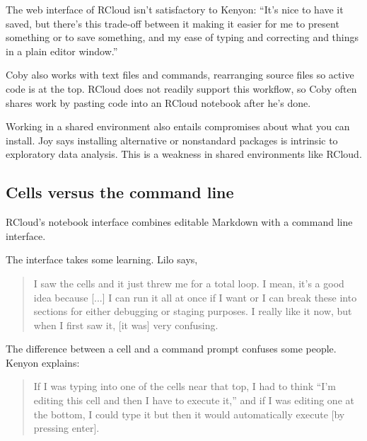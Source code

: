 The web interface of RCloud isn't satisfactory to Kenyon: ``It's nice to have
it saved, but there's this trade-off between it making it easier for me to
present something or to save something, and my ease of typing and
correcting and things in a plain editor window.''

Coby also works with text files and commands, rearranging source files
so active code is at the top. RCloud does not readily support this
workflow, so Coby often shares work by pasting code into an RCloud
notebook after he's done.


Working in a shared environment also entails compromises about what you can
install. Joy says installing alternative or nonstandard packages is
intrinsic to exploratory data analysis. This is a weakness in shared
environments like RCloud.

\subsection{Cells versus the command line}
RCloud's notebook interface combines editable Markdown with a command line
interface.

The interface takes some learning. Lilo says,
\begin{quote}
I saw the cells and it just threw me
for a total loop. I mean, it's a good idea because [...] I can run it all at
once if I want or I can break these into sections for either debugging or
staging purposes. I really like it now, but when I first saw it, [it was] very
confusing.
\end{quote}

The difference between a cell and a command prompt confuses some people.
Kenyon explains:
\begin{quote}
If I was typing into one of the cells near that top, I had to think ``I'm editing
this cell and then I have to execute it,'' and if I was editing one at the bottom,
I could type it but then it would automatically execute [by pressing enter].
\end{quote}

